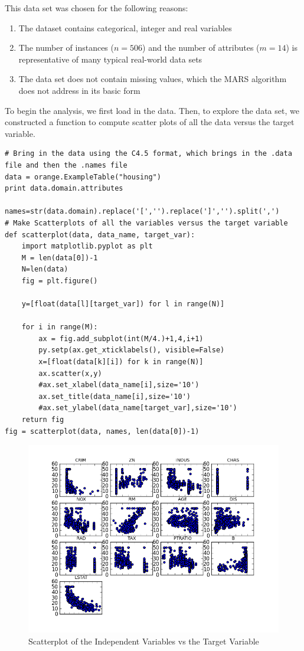 This data set was chosen for the following reasons:
\begin{enumerate}
\item The dataset contains categorical, integer and real variables
\item The number of instances ($n=506$) and the number of attributes ($m=14$) is representative of many typical real-world data sets
\item The data set does not contain missing values, which the MARS algorithm does not address in its basic form
\end{enumerate}

To begin the analysis, we first load in the data. Then, to explore the data set, we constructed a function to compute scatter plots of all the data versus the target variable. 
\begin{lstlisting}[caption={Load the Data and Explore},label=2nd,firstnumber=25]
# Bring in the data using the C4.5 format, which brings in the .data file and then the .names file
data = orange.ExampleTable("housing")
print data.domain.attributes

names=str(data.domain).replace('[','').replace(']','').split(',')
# Make Scatterplots of all the variables versus the target variable
def scatterplot(data, data_name, target_var):
    import matplotlib.pyplot as plt
    M = len(data[0])-1
    N=len(data)
    fig = plt.figure()

    y=[float(data[l][target_var]) for l in range(N)]

    for i in range(M):
        ax = fig.add_subplot(int(M/4.)+1,4,i+1)
        py.setp(ax.get_xticklabels(), visible=False)
        x=[float(data[k][i]) for k in range(N)]
        ax.scatter(x,y)
        #ax.set_xlabel(data_name[i],size='10')
        ax.set_title(data_name[i],size='10')
        #ax.set_ylabel(data_name[target_var],size='10')
    return fig
fig = scatterplot(data, names, len(data[0])-1)
\end{lstlisting}

\begin{figure}[H]
    \centering
       \includegraphics[width=6.5in]{scatter.png}
    \caption{Scatterplot of the Independent Variables vs the Target Variable}
    \label{Example Data}
\end{figure}

